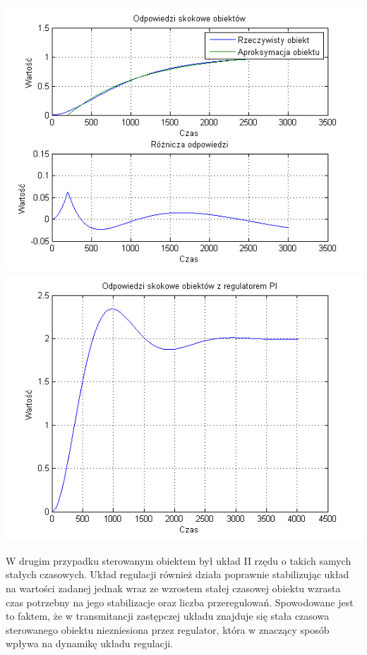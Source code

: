 \documentclass[10pt,a4paper]{article}
\begin{document}
\begin{center}
\includegraphics[scale=1]{images/jeden/skrypt_83.png}\\
\includegraphics[scale=1]{images/jeden/skrypt_84.png}\\
\end{center}
\newpage
W drugim przypadku sterowanym obiektem był układ II rzędu o takich samych stałych czasowych. Układ regulacji również działa poprawnie stabilizując układ na wartości zadanej jednak wraz ze wzrostem stałej czasowej obiektu wzrasta czas potrzebny na jego stabilizacje oraz liczba przeregulowań. Spowodowane jest to faktem, że w transmitancji zastępczej układu znajduje się stała czasowa sterowanego obiektu niezniesiona przez regulator, która w znaczący sposób wpływa na dynamikę układu regulacji.
\newpage
\end{document}
